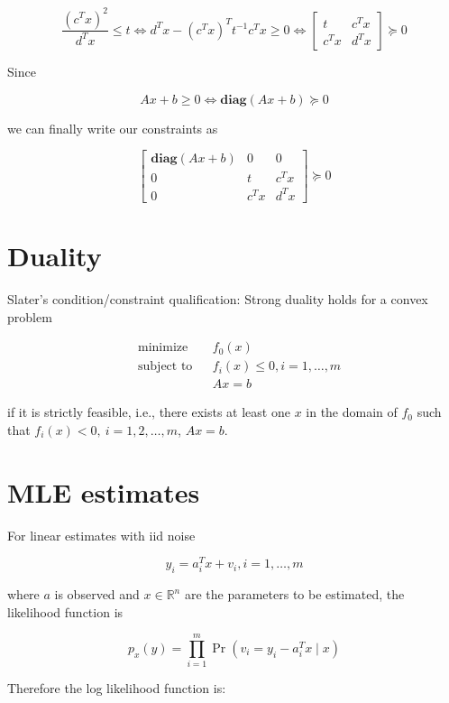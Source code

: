 \[
\frac{(c^Tx)^2}{d^Tx} \leq t \iff d^Tx - (c^Tx)^T t^{-1} c^Tx \geq 0  \iff  \begin{bmatrix}
    t      & c^Tx \\
    c^Tx & d^Tx
\end{bmatrix} \succeq 0 
\]

Since

\[
Ax + b \geq 0 \iff \textbf{diag}(Ax + b) \succeq 0
\]

we can finally write our constraints as 

\[
\begin{bmatrix}
    \textbf{diag}(Ax + b) & 0 & 0 \\
    0 & t      & c^Tx \\
    0 & c^Tx & d^Tx
\end{bmatrix} \succeq 0 
\]


\section{Duality}

\begin{theorem} \label{cvx.slater.thm} Slater's condition/constraint qualification: Strong duality holds for a convex problem

\[
\begin{aligned}
& {\text{minimize}}
& & f_0(x) \\
& \text{subject to}
& & f_i(x) \leq 0, i = 1, \ldots, m \\
& & & Ax = b
\end{aligned}
\]

if it is strictly feasible, i.e., there exists at least one \(x\) in the domain of \(f_0\) such that \(f_i(x) < 0, \ i=1,2, \ldots, m\), \(Ax=b\).

\end{theorem}

\section{MLE estimates}

For linear estimates with iid noise

\[
y_i = a_i^T x + v_i, i = 1, \ldots, m
\]

where \(a\) is observed and \(x \in \mathbb{R}^n\) are the parameters to be estimated, the likelihood function is

\[
p_x(y) = \prod_{i=1}^m \Pr(v_i = y_i - a_i^Tx \mid x)
\]

Therefore the log likelihood function is:

